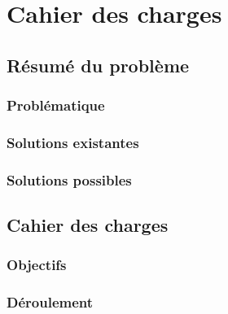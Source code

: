 

\chapter{Cahier des charges}



\section*{Résumé du problème}
\lipsum[110-111]

\subsection*{Problématique}
\lipsum[110-110]

\subsection*{Solutions existantes}
\lipsum[1-1]

\subsection*{Solutions possibles}
\lipsum[1-1]



\section*{Cahier des charges}
\lipsum[1-1]


\subsection*{Objectifs}
\lipsum[1-1]

\subsection*{Déroulement}

